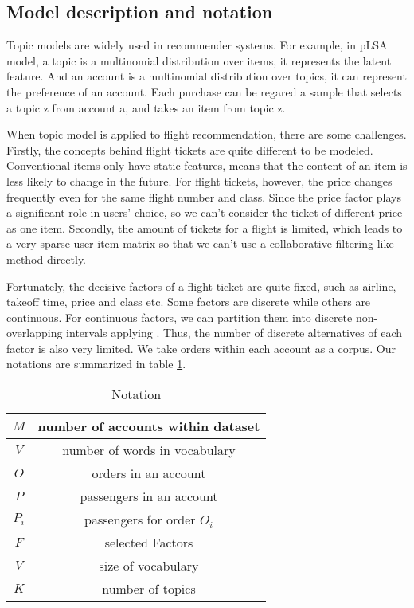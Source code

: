 \documentclass{llncs}
\begin{document}
\subsection{Model description and notation}
Topic models are widely used in recommender systems. For example, in pLSA model\cite{tomas:coll}, a topic is a multinomial distribution over items, it represents the latent feature. And an account is a multinomial distribution over topics, it can represent the preference of an account. Each purchase can be regared a sample that selects a topic z from account a, and takes an item from topic z.\par
When topic model is applied to flight recommendation, there are some challenges. Firstly, the concepts behind flight tickets are quite different to be modeled. Conventional items only have static features, means that the content of an item is less likely to change in the future. For flight tickets, however, the price changes frequently even for the same flight number and class. Since the price factor plays a significant role in users' choice, so we can't consider the ticket of different price as one item. Secondly, the amount of tickets for a flight is limited, which leads to a very sparse user-item matrix so that we can't use a collaborative-filtering like method directly.\par
Fortunately, the decisive factors of a flight ticket are quite fixed, such as airline, takeoff time, price and class etc. Some factors are discrete while others are continuous. For continuous factors, we can partition them into discrete non-overlapping intervals applying . Thus, the number of discrete alternatives of each factor is also very limited. We take orders within each account as a corpus. Our notations are summarized in table \ref{tab:not}.\par
\begin{table}[!htbp]
\centering
\caption{\label{tab:not}Notation}
\begin{tabular}{|c|c|} \hline
$M$ & number of accounts within dataset\\ \hline
$V$ & number of words in vocabulary\\ \hline
$O$ & orders in an account\\ \hline
$P$ & passengers in an account\\ \hline
$P_i$ & passengers for order $O_i$ \\ \hline
$F$ & selected Factors\\ \hline
$V$ & size of vocabulary\\ \hline
$K$ & number of topics\\ \hline
\end{tabular}
\end{table}
\end{document}
